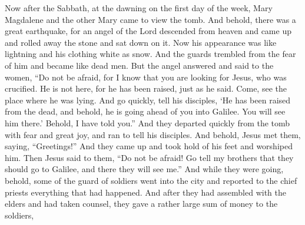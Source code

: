 \begin{biblechapter} %
 Now after the Sabbath, at the dawning on the first day of the week, Mary Magdalene and the other Mary came to view the tomb.
\verse And behold, there was a great earthquake, for an angel of the Lord descended from heaven and came up and rolled away the stone and sat down on it.
\verse Now his appearance was like lightning and his clothing white as snow.
\verse And the guards trembled from the fear of him and became like dead men.
\verse But the angel answered and said to the women, “Do not be afraid, for I know that you are looking for Jesus, who was crucified.
\verse He is not here, for he has been raised, just as he said. Come, see the place where he was lying.
\verse And go quickly, tell his disciples, ‘He has been raised from the dead, and behold, he is going ahead of you into Galilee. You will see him there.’ Behold, I have told you.”
\verse And they departed quickly from the tomb with fear and great joy, and ran to tell his disciples.
\verse And behold, Jesus met them, saying, “Greetings!” And they came up and took hold of his feet and worshiped him.
\verse Then Jesus said to them, “Do not be afraid! Go tell my brothers that they should go to Galilee, and there they will see me.”
 And while they were going, behold, some of the guard of soldiers went into the city and reported to the chief priests everything that had happened.
\verse And after they had assembled with the elders and had taken counsel, they gave a rather large sum of money to the soldiers,

\end{biblechapter}
